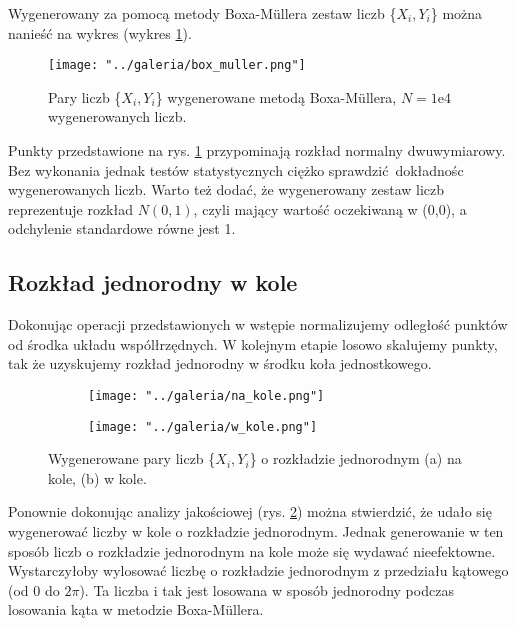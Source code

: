 \documentclass[a4paper, 12pt]{article}
\begin{document}
    Wygenerowany za pomocą metody Boxa-M\"ullera zestaw liczb \{$X_i, Y_i$\} można nanieść na wykres (wykres \ref{fig:box_mul}).
    
    \begin{figure}[h]
        \centering
        \texttt{[image: "../galeria/box\_muller.png"]}
        \caption{Pary liczb \{$X_i, Y_i$\} wygenerowane metodą Boxa-M\"ullera, $N=1\text{e}4$ wygenerowanych liczb.}
        \label{fig:box_mul}
    \end{figure}

    \noaka Punkty przedstawione na rys. \ref{fig:box_mul} przypominają rozkład normalny dwuwymiarowy.
    Bez wykonania jednak testów statystycznych ciężko sprawdzić dokładnośc wygenerowanych liczb.
    Warto też dodać, że wygenerowany zestaw liczb reprezentuje rozkład $N(0,1)$, czyli mający wartość oczekiwaną w (0,0), a odchylenie standardowe równe jest 1.  

    \newpage

    \subsection*{Rozkład jednorodny w kole}

    Dokonując operacji przedstawionych w wstępie normalizujemy odległość punktów od środka układu wspólłrzędnych. 
    W kolejnym etapie losowo skalujemy punkty, tak że uzyskujemy rozkład jednorodny w środku koła jednostkowego.
    \begin{figure}[H]
        \centering
        \begin{subfigure}{0.45\textwidth}
            \centering
            \texttt{[image: "../galeria/na\_kole.png"]}
            \caption{}
        \end{subfigure}
        \begin{subfigure}{0.45\textwidth}
            \centering
            \texttt{[image: "../galeria/w\_kole.png"]}
            \caption{}
        \end{subfigure}
        \caption{Wygenerowane pary liczb \{$X_i,Y_i$\} o rozkładzie jednorodnym (a) na kole, (b)  w kole.}
        \label{kolo}
    \end{figure}   

    \noaka Ponownie dokonując analizy jakościowej (rys. \ref{kolo}) można stwierdzić, że udało się wygenerować liczby w kole o rozkładzie jednorodnym.
    Jednak generowanie w ten sposób liczb o rozkładzie jednorodnym na kole może się wydawać nieefektowne.
    Wystarczyłoby wylosować liczbę o rozkładzie jednorodnym z przedziału kątowego (od $0$ do $2\pi$).
    Ta liczba i tak jest losowana w sposób jednorodny podczas losowania kąta w metodzie Boxa-M\"ullera.
\end{document}
